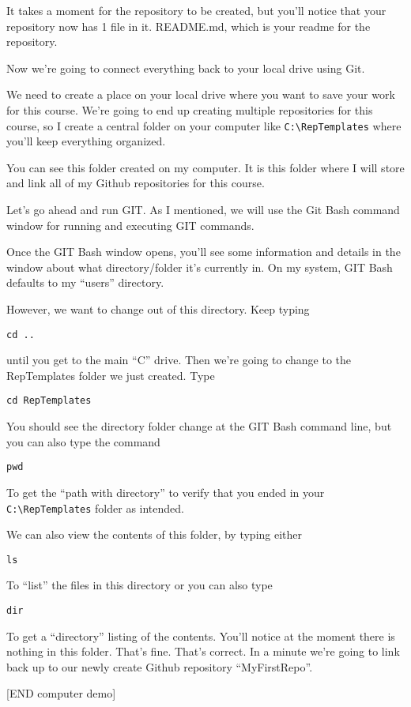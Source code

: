 \documentclass[]{book}
\theoremstyle{definition}
\theoremstyle{definition}
\theoremstyle{definition}
\theoremstyle{remark}
\begin{document}
It takes a moment for the repository to be created, but you'll notice
that your repository now has 1 file in it. README.md, which is your
readme for the repository.

Now we're going to connect everything back to your local drive using
Git.

We need to create a place on your local drive where you want to save
your work for this course. We're going to end up creating multiple
repositories for this course, so I create a central folder on your
computer like \texttt{C:\textbackslash{}RepTemplates} where you'll keep
everything organized.

You can see this folder created on my computer. It is this folder where
I will store and link all of my Github repositories for this course.

Let's go ahead and run GIT. As I mentioned, we will use the Git Bash
command window for running and executing GIT commands.

Once the GIT Bash window opens, you'll see some information and details
in the window about what directory/folder it's currently in. On my
system, GIT Bash defaults to my ``users'' directory.

However, we want to change out of this directory. Keep typing

\texttt{cd\ ..}

until you get to the main ``C'' drive. Then we're going to change to the
RepTemplates folder we just created. Type

\texttt{cd\ RepTemplates}

You should see the directory folder change at the GIT Bash command line,
but you can also type the command

\texttt{pwd}

To get the ``path with directory'' to verify that you ended in your
\texttt{C:\textbackslash{}RepTemplates} folder as intended.

We can also view the contents of this folder, by typing either

\texttt{ls}

To ``list'' the files in this directory or you can also type

\texttt{dir}

To get a ``directory'' listing of the contents. You'll notice at the
moment there is nothing in this folder. That's fine. That's correct. In
a minute we're going to link back up to our newly create Github
repository ``MyFirstRepo''.

{[}END computer demo{]}
\end{document}
